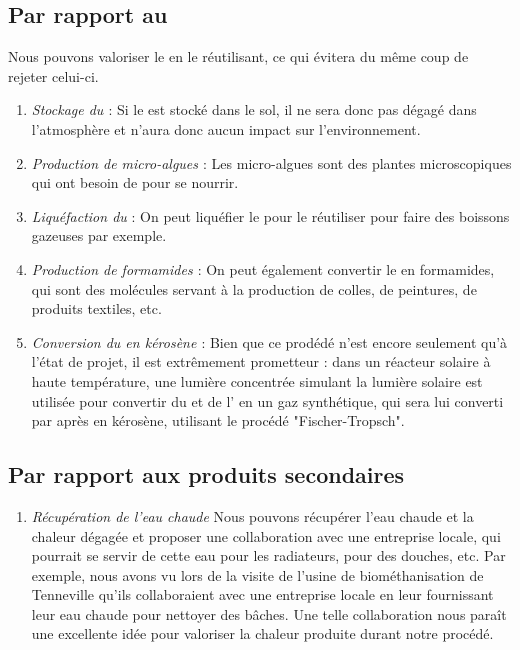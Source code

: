 \documentclass[a4paper, oneside]{scrartcl}
\begin{document}
\subsection{Par rapport au \texorpdfstring{}{CO \texttwoinferior}}
Nous pouvons valoriser le  en le réutilisant, ce qui évitera du même coup de rejeter celui-ci.
\begin{enumerate}
\item \emph{Stockage du   \cite{capt} \cite{capt2}} : Si le  est stocké dans le sol, il ne sera donc pas dégagé dans l'atmosphère et n'aura donc aucun impact sur l'environnement. 
\item \emph{Production de micro-algues \cite{algues}} : Les micro-algues sont des plantes microscopiques qui ont besoin de  pour se nourrir. 
\item \emph{Liquéfaction du } : On peut liquéfier le  pour le réutiliser pour faire des boissons gazeuses par exemple. 
\item \emph{Production de formamides \cite{sol1} \cite{sol2}} : On peut également convertir le  en formamides, qui sont des molécules servant à la production de colles, de peintures, de produits textiles, etc.
\item \emph{Conversion du  en kérosène \cite{sol3} \cite{sol4}} : Bien que ce prodédé n'est encore seulement qu'à l'état de projet, il est extrêmement prometteur : dans un réacteur solaire à haute température, une lumière concentrée simulant la lumière solaire est utilisée pour convertir du  et de l' en un gaz synthétique, qui sera lui converti par après en kérosène, utilisant le procédé "Fischer-Tropsch".
\end{enumerate}
\subsection{Par rapport aux produits secondaires}
\begin{enumerate}
\item \emph{Récupération de l'eau chaude} Nous pouvons récupérer l'eau chaude et la chaleur dégagée et proposer une collaboration avec une entreprise locale, qui pourrait se servir de cette eau pour les radiateurs, pour des douches, etc. Par exemple, nous avons vu lors de la visite de l'usine de biométhanisation de Tenneville qu'ils collaboraient avec une entreprise locale en leur fournissant leur eau chaude pour nettoyer des bâches. Une telle collaboration nous paraît une excellente idée pour valoriser la chaleur produite durant notre procédé.
\end{enumerate}

\printbibliography[heading=bibintoc]
\end{document}
